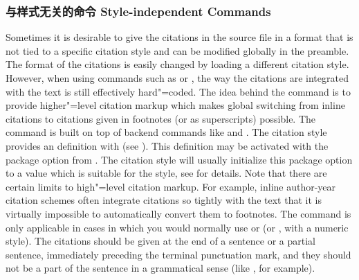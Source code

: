 \subsubsection{与样式无关的命令 Style-independent Commands}
\label{use:cit:aut}

Sometimes it is desirable to give the citations in the source file in a format that is not tied to a specific citation style and can be modified globally in the preamble. The format of the citations is easily changed by loading a different citation style. However, when using commands such as  or , the way the citations are integrated with the text is still effectively hard"=coded. The idea behind the  command is to provide higher"=level citation markup which makes global switching from inline citations to citations given in footnotes (or as superscripts) possible. The  command is built on top of backend commands like  and . The citation style provides an  definition with  (see ). This definition may be activated with the  package option from . The citation style will usually initialize this package option to a value which is suitable for the style, see  for details. Note that there are certain limits to high"=level citation markup. For example, inline author-year citation schemes often integrate citations so tightly with the text that it is virtually impossible to automatically convert them to footnotes. The  command is only applicable in cases in which you would normally use  or  (or , with a numeric style). The citations should be given at the end of a sentence or a partial sentence, immediately preceding the terminal punctuation mark, and they should not be a part of the sentence in a grammatical sense (like , for example).

